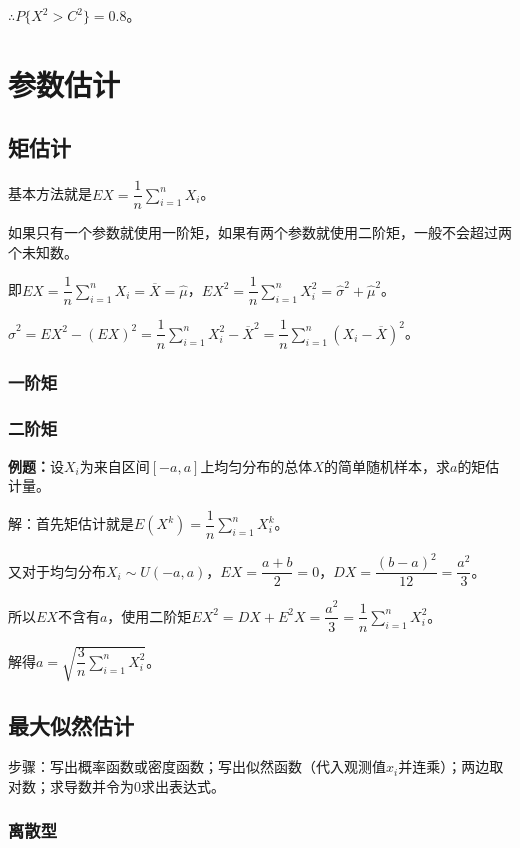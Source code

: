 $\therefore P\{X^2>C^2\}=0.8$。

\section{参数估计}

\subsection{矩估计}

基本方法就是$EX=\dfrac{1}{n}\sum\limits_{i=1}^nX_i$。

如果只有一个参数就使用一阶矩，如果有两个参数就使用二阶矩，一般不会超过两个未知数。

即$EX=\dfrac{1}{n}\sum\limits_{i=1}^nX_i=\overline{X}=\hat{\mu}$，$EX^2=\dfrac{1}{n}\sum\limits_{i=1}^nX_i^2=\hat{\sigma}^2+\hat{\mu}^2$。

$\hat{\sigma}^2=EX^2-(EX)^2=\dfrac{1}{n}\sum\limits_{i=1}^nX_i^2-\overline{X}^2=\dfrac{1}{n}\sum\limits_{i=1}^n(X_i-\overline{X})^2$。

\subsubsection{一阶矩}

\subsubsection{二阶矩}

\textbf{例题：}设$X_i$为来自区间$[-a,a]$上均匀分布的总体$X$的简单随机样本，求$a$的矩估计量。

解：首先矩估计就是$E(X^k)=\dfrac{1}{n}\sum\limits_{i=1}^nX_i^k$。

又对于均匀分布$X_i\sim U(-a,a)$，$EX=\dfrac{a+b}{2}=0$，$DX=\dfrac{(b-a)^2}{12}=\dfrac{a^2}{3}$。

所以$EX$不含有$a$，使用二阶矩$EX^2=DX+E^2X=\dfrac{a^2}{3}=\dfrac{1}{n}\sum\limits_{i=1}^nX_i^2$。

解得$a=\sqrt{\dfrac{3}{n}\sum\limits_{i=1}^nX_i^2}$。

\subsection{最大似然估计}

步骤：写出概率函数或密度函数；写出似然函数（代入观测值$x_i$并连乘）；两边取对数；求导数并令为0求出表达式。

\subsubsection{离散型}

